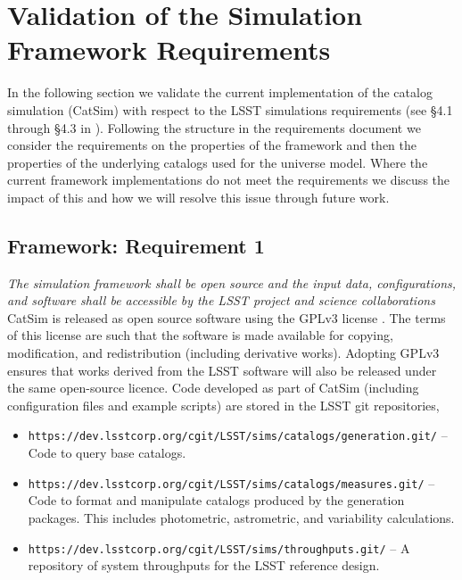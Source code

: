 \documentclass[11pt]{article}
\begin{document}
\section{Validation of the Simulation Framework Requirements}

In the following section we validate the current implementation of the
catalog simulation (CatSim) with respect to the LSST simulations
requirements (see \S 4.1 through \S 4.3 in
\citealt{requirements}). Following the structure in the requirements
document we consider the requirements on the properties of the
framework and then the properties of the underlying catalogs used for
the universe model.  Where the current framework implementations do
not meet the requirements we discuss the impact of this and how we
will resolve this issue through future work.

\subsection{Framework: Requirement 1}

{\it  The simulation framework shall be open source and the input data, configurations,
and software shall be accessible by the LSST project and science
collaborations}\\

CatSim is released as open source software using the GPLv3 license
\citep{gpl}. The terms of this license are such that the software is
made available for copying, modification, and redistribution
(including derivative works). Adopting GPLv3 ensures that works
derived from the LSST software will also be released under the same
open-source licence. Code developed as part of CatSim (including
configuration files and example scripts) are stored in the LSST 
git repositories,

\begin{itemize}
\item {\tt https://dev.lsstcorp.org/cgit/LSST/sims/catalogs/generation.git/} -- Code to query
base catalogs.
\item {\tt https://dev.lsstcorp.org/cgit/LSST/sims/catalogs/measures.git/} -- Code to format
and manipulate catalogs produced by the generation packages.  This includes photometric, 
astrometric, and variability calculations.
\item {\tt https://dev.lsstcorp.org/cgit/LSST/sims/throughputs.git/}
  -- A repository
of system throughputs for the LSST reference design.
\end{itemize}
\end{document}
